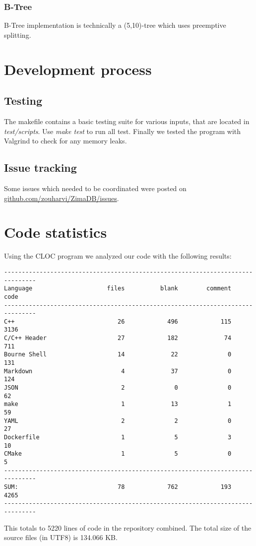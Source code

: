 \documentclass[a4paper]{article}
\begin{document}
\subsubsection{B-Tree}
B-Tree implementation is technically a (5,10)-tree which uses preemptive splitting.

\section{Development process}
\subsection{Testing}
The makefile contains a basic testing suite for various inputs, that are located in \textit{test/scripts}. Use \textit{make test} to run all test. Finally we tested the program with Valgrind to check for any memory leaks.

\subsection{Issue tracking}
Some issues which needed to be coordinated were posted on \href{https://github.com/zouharvi/ZimaDB/issues}{github.com/zouharvi/ZimaDB/issues}.
    
\section{Code statistics}
Using the CLOC program we analyzed our code with the following results:

\begin{lstlisting}
-------------------------------------------------------------------------------
Language                     files          blank        comment           code
-------------------------------------------------------------------------------
C++                             26            496            115           3136
C/C++ Header                    27            182             74            711
Bourne Shell                    14             22              0            131
Markdown                         4             37              0            124
JSON                             2              0              0             62
make                             1             13              1             59
YAML                             2              2              0             27
Dockerfile                       1              5              3             10
CMake                            1              5              0              5
-------------------------------------------------------------------------------
SUM:                            78            762            193           4265
-------------------------------------------------------------------------------
\end{lstlisting}
This totals to 5220 lines of code in the repository combined. The total size of the source files (in UTF8) is 134.066 KB.
\end{document}
